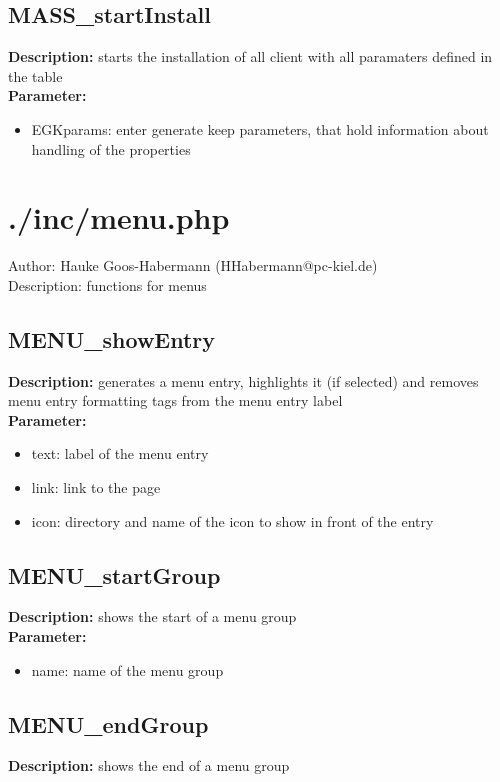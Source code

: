 \subsection{MASS\_startInstall}
\textbf{Description:} starts the installation of all client with all paramaters defined in the table\\
\textbf{Parameter:}
\begin{itemize}
\item EGKparams: enter generate keep parameters, that hold information about handling of the properties
\end{itemize}

\newpage\section{./inc/menu.php}
 Author: Hauke Goos-Habermann (HHabermann@pc-kiel.de)\\
 Description: functions for menus\\

\subsection{MENU\_showEntry}
\textbf{Description:} generates a menu entry, highlights it (if selected) and removes menu entry formatting tags from the menu entry label\\
\textbf{Parameter:}
\begin{itemize}
\item text: label of the menu entry
\item link: link to the page
\item icon: directory and name of the icon to show in front of the entry
\end{itemize}

\subsection{MENU\_startGroup}
\textbf{Description:} shows the start of a menu group\\
\textbf{Parameter:}
\begin{itemize}
\item name: name of the menu group
\end{itemize}

\subsection{MENU\_endGroup}
\textbf{Description:} shows the end of a menu group\\

